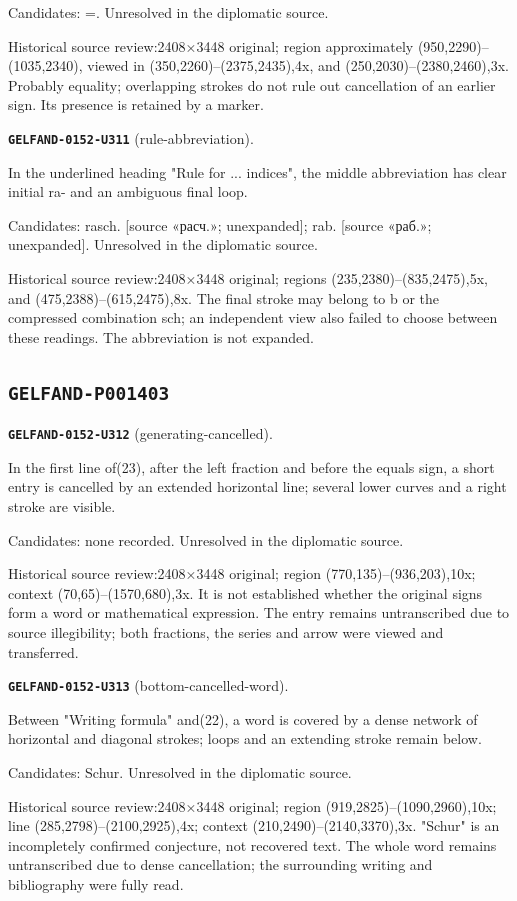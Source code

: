 Candidates: =. Unresolved in the diplomatic source.\par
Historical source review:2408×3448 original; region approximately (950,2290)–(1035,2340), viewed in (350,2260)–(2375,2435),4x, and (250,2030)–(2380,2460),3x. Probably equality; overlapping strokes do not rule out cancellation of an earlier sign. Its presence is retained by a marker.\par\medskip
\par\noindent\leavevmode{}\label{GELFAND-0152-U311}\textbf{\texttt{GELFAND-0152-U311}} (rule-abbreviation).\nopagebreak[4]\par
In the underlined heading "Rule for ... indices", the middle abbreviation has clear initial ra- and an ambiguous final loop.\par
Candidates: rasch. [source «расч.»; unexpanded]; rab. [source «раб.»; unexpanded]. Unresolved in the diplomatic source.\par
Historical source review:2408×3448 original; regions (235,2380)–(835,2475),5x, and (475,2388)–(615,2475),8x. The final stroke may belong to b or the compressed combination sch; an independent view also failed to choose between these readings. The abbreviation is not expanded.\par\medskip
\subsection*{\texttt{GELFAND-P001403}}
\par\noindent\leavevmode{}\label{GELFAND-0152-U312}\textbf{\texttt{GELFAND-0152-U312}} (generating-cancelled).\nopagebreak[4]\par
In the first line of(23), after the left fraction and before the equals sign, a short entry is cancelled by an extended horizontal line; several lower curves and a right stroke are visible.\par
Candidates: none recorded. Unresolved in the diplomatic source.\par
Historical source review:2408×3448 original; region (770,135)–(936,203),10x; context (70,65)–(1570,680),3x. It is not established whether the original signs form a word or mathematical expression. The entry remains untranscribed due to source illegibility; both fractions, the series and arrow were viewed and transferred.\par\medskip
\par\noindent\leavevmode{}\label{GELFAND-0152-U313}\textbf{\texttt{GELFAND-0152-U313}} (bottom-cancelled-word).\nopagebreak[4]\par
Between "Writing formula" and(22), a word is covered by a dense network of horizontal and diagonal strokes; loops and an extending stroke remain below.\par
Candidates: Schur. Unresolved in the diplomatic source.\par
Historical source review:2408×3448 original; region (919,2825)–(1090,2960),10x; line (285,2798)–(2100,2925),4x; context (210,2490)–(2140,3370),3x. "Schur" is an incompletely confirmed conjecture, not recovered text. The whole word remains untranscribed due to dense cancellation; the surrounding writing and bibliography were fully read.\par\medskip
